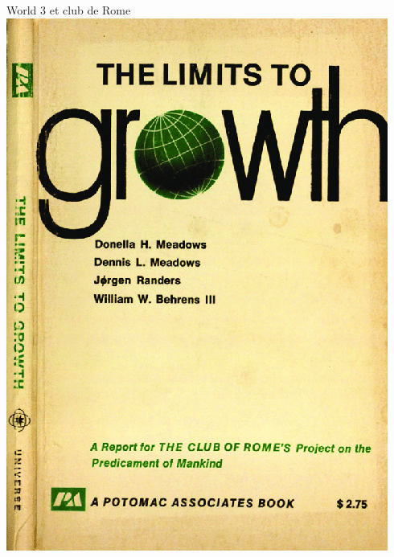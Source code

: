 \documentclass{beamer}
\begin{document}
\begin{frame}{World 3 et club de Rome}
\includegraphics[scale=0.1]{images/limits_to_growth.png}

\end{frame}
\end{document}
